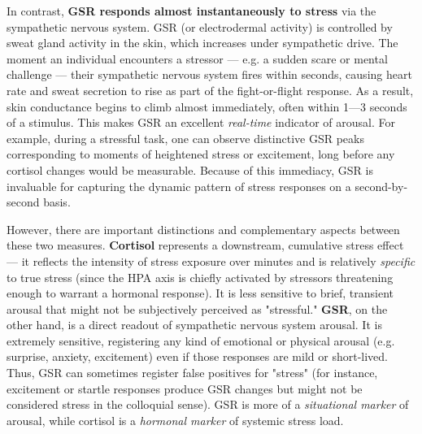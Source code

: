 \documentclass[11pt,a4paper]{report}
\begin{document}
In contrast, \textbf{GSR responds almost instantaneously to stress} via the
sympathetic nervous system. GSR (or electrodermal activity) is
controlled by sweat gland activity in the skin, which increases under
sympathetic drive. The moment an individual encounters a stressor ---
e.g. a sudden scare or mental challenge --- their sympathetic nervous
system fires within seconds, causing heart rate and sweat secretion to
rise as part of the fight-or-flight
response\cite{CortisolStressIndicator2020}.
As a result, skin conductance begins to climb almost immediately, often
within 1---3 seconds of a
stimulus\cite{ElectrodermalActivityWiki}.
This makes GSR an excellent \textit{real-time} indicator of arousal. For
example, during a stressful task, one can observe distinctive GSR peaks
corresponding to moments of heightened stress or excitement, long before
any cortisol changes would be
measurable\cite{CortisolStressIndicator2020}.
Because of this immediacy, GSR is invaluable for capturing the dynamic
pattern of stress responses on a second-by-second basis.

However, there are important distinctions and complementary aspects
between these two measures. \textbf{Cortisol} represents a downstream,
cumulative stress effect --- it reflects the intensity of stress exposure
over minutes and is relatively \textit{specific} to true stress (since the HPA
axis is chiefly activated by stressors threatening enough to warrant a
hormonal response). It is less sensitive to brief, transient arousal
that might not be subjectively perceived as "stressful." \textbf{GSR}, on the
other hand, is a direct readout of sympathetic nervous system arousal.
It is extremely sensitive, registering any kind of emotional or physical
arousal (e.g. surprise, anxiety, excitement) even if those responses are
mild or
short-lived\cite{GSRPPGMachineLearning2024}.
Thus, GSR can sometimes register false positives for "stress" (for
instance, excitement or startle responses produce GSR changes but might
not be considered stress in the colloquial sense). GSR is more of a
\textit{situational marker} of arousal, while cortisol is a \textit{hormonal marker}
of systemic stress
load\cite{SimulatorValidityPhysiological2025}.
\end{document}
